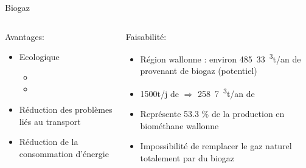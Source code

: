 \documentclass{beamer}
\begin{document}
\begin{frame}{Biogaz}
	\begin{columns}
		
		\begin{column}{0.40\textwidth}		
		Avantages:
			\begin{itemize}
			\item Ecologique 
				\begin{itemize}
				\item {}
				\item {}
				\end{itemize}
			\item Réduction des problèmes liés au transport
			\item Réduction de la consommation d'énergie
			\end{itemize}
		\end{column}
		\begin{column}{0.40\textwidth}
		Faisabilité:
		\begin{itemize}
		\item Région wallonne : environ \unit{485.33 ^3}{t/an} de  provenant de biogaz (potentiel)
		\item \unit{1500}{t/j} de  $\Longrightarrow$ \unit{258.7 ^3}{t/an} de 
		\item Représente 53.3 \%  de la production en biométhane wallonne
		\item Impossibilité de remplacer le gaz naturel totalement par du biogaz
		\end{itemize}
		\end{column}
	\end{columns}
\end{frame}
\end{document}

